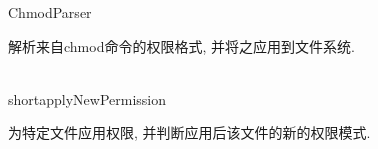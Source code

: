 \begin{XeClass}{ChmodParser}
   
 解析来自chmod命令的权限格式, 并将之应用到文件系统.

  \begin{XeMethod}{\XePublic\\ }{short}{applyNewPermission}
       
 为特定文件应用权限, 并判断应用后该文件的新的权限模式.

  \end{XeMethod}

\end{XeClass}
